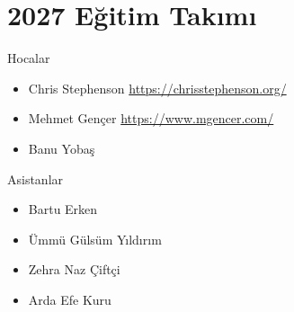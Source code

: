 \documentclass[12pt, a4paper]{article}
\begin{document}
\section*{2027 Eğitim Takımı}
Hocalar
\begin{itemize}
\item Chris Stephenson \url{https://chrisstephenson.org/}
\item Mehmet Gençer \url{https://www.mgencer.com/}
\item Banu Yobaş
\end{itemize}
Asistanlar
\begin{itemize}
\item Bartu Erken

\item Ümmü Gülsüm Yıldırım

\item Zehra Naz Çiftçi

\item Arda Efe Kuru
\end{itemize}
\end{document}
